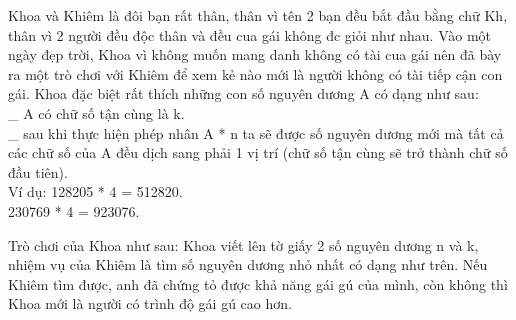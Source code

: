 Khoa và Khiêm là đôi bạn rất thân, thân vì tên 2 bạn đều bắt đầu bằng chữ Kh, thân vì 2 người đều độc thân và đều cua gái không đc giỏi như nhau. Vào một ngày đẹp trời, Khoa vì không muốn mang danh không có tài cua gái nên đã bày ra một trò chơi với Khiêm để xem kẻ nào mới là người không có tài tiếp cận con gái. Khoa đặc biệt rất thích những con số nguyên dương A có dạng như sau:   
\\   \_ A có chữ số tận cùng là k.   
\\   \_ sau khi thực hiện phép nhân A * n ta sẽ được số nguyên dương mới mà tất cả các chữ số của A đều dịch sang phải 1 vị trí (chữ số tận cùng sẽ trở thành chữ số đầu tiên).   
\\   Ví dụ:      128205 * 4 = 512820.   
\\   230769 * 4 = 923076.  

   Trò chơi của Khoa như sau: Khoa viết lên tờ giấy 2 số nguyên dương n và k, nhiệm vụ của Khiêm là tìm số nguyên dương nhỏ nhất có dạng như trên. Nếu Khiêm tìm được, anh đã chứng tỏ được khả năng gái gú của mình, còn không thì Khoa mới là người có trình độ gái gú cao hơn.  

\